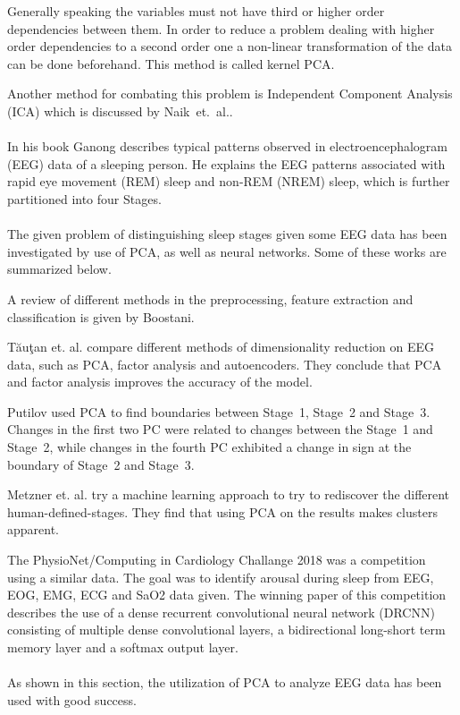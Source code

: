 \documentclass[a4paper]{IEEEtran}
\begin{document}
Generally speaking the variables must not have third or higher order dependencies between them. In order to reduce a problem dealing with higher order dependencies to a second order one a non-linear transformation of the data can be done beforehand. This method is called kernel PCA\cite{Shlens2014}.

Another method for combating this problem is Independent Component Analysis (ICA) which is discussed by Naik~et.~al.\cite{Naik2011}.
\\
\\
In his book Ganong describes typical patterns observed in electroencephalogram (EEG) data of a sleeping person\cite{Ganong1997}. He explains the EEG patterns associated with rapid eye movement (REM) sleep and non-REM (NREM) sleep, which is further partitioned into four Stages.
\\
\\
The given problem of distinguishing sleep stages given some EEG data has been investigated by use of PCA, as well as neural networks. Some of these works are summarized below.

A review of different methods in the preprocessing, feature extraction and classification is given by Boostani\cite{Boostani2017}.

Tăuţan et. al.\cite{Tautan2021} compare different methods of dimensionality reduction on EEG data, such as PCA, factor analysis and autoencoders. They conclude that PCA and factor analysis improves the accuracy of the model.

Putilov\cite{Putilov2015} used PCA to find boundaries between Stage~1, Stage~2 and Stage~3. Changes in the first two PC were related to changes between the Stage~1 and Stage~2, while changes in the fourth PC exhibited a change in sign at the boundary of Stage~2 and Stage~3.

Metzner et. al.\cite{Metzner2023} try a machine learning approach to try to rediscover the different human-defined-stages. They find that using PCA on the results makes clusters apparent.

The PhysioNet/Computing in Cardiology Challange 2018 was a competition using a similar data\cite{Ghassemi2018}. The goal was to identify arousal during sleep from EEG, EOG, EMG, ECG and SaO2 data given. The winning paper of this competition describes the use of a dense recurrent convolutional neural network (DRCNN) consisting of multiple dense convolutional layers, a bidirectional long-short term memory layer and a softmax output layer\cite{Howe2018}.
\\
\\
As shown in this section, the utilization of PCA to analyze EEG data has been used with good success.
\end{document}
